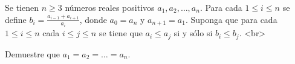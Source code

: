 Se tienen $n\geq 3$ números reales positivos $a_1,a_2,\dots,a_n$. Para cada $1\leq i\leq n$ se define $b_i=\frac{a_{i-1}+a_{i+1}}{a_i}$, donde $a_0=a_n$ y $a_{n+1}=a_1$. Suponga que para cada $1\leq i\leq n$ cada $i\leq j\leq n$ se tiene que $a_i\leq a_j$ si y sólo si $b_i\leq b_j$. <br>

Demuestre que $a_1=a_2=\dots =a_n$.